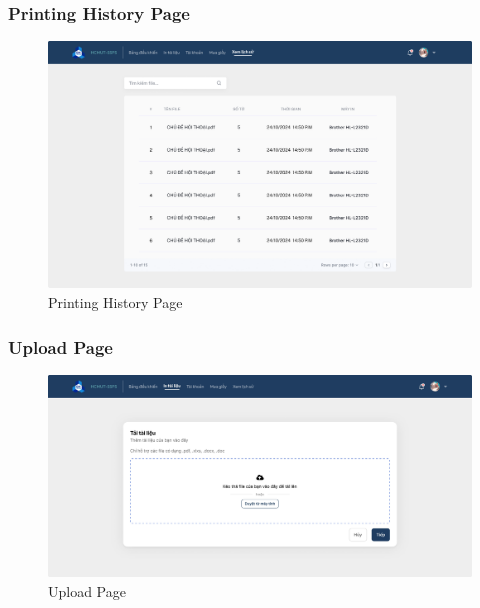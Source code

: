 \subsubsection{Printing History Page}
\begin{figure}[htbp]
     \centering
     \includegraphics[width=1\linewidth]{Images/UI/Printing History Page.png}
     \caption{Printing History Page}
 \end{figure}
\subsubsection{Upload Page}
\begin{figure}[h!]
     \centering
     \includegraphics[width=1\linewidth]{Images/UI/Upload Page.jpg}
     \caption{Upload Page}
 \end{figure}


